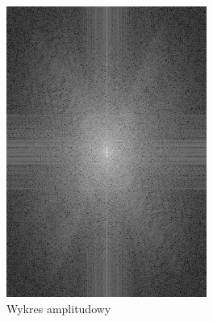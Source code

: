 \begin{figure}[ht]
\begin{minipage}[t]{0.325\linewidth}
        \includegraphics[width=\linewidth]{Rozdziały/02.Podstawy_teoretyczne/Obrazy/fft_magnitude.png}
        \caption{Wykres amplitudowy}
        \label{fig:image25}
    \end{minipage}
    \begin{minipage}[t]{0.325\linewidth}

\end{minipage}
\end{figure}
